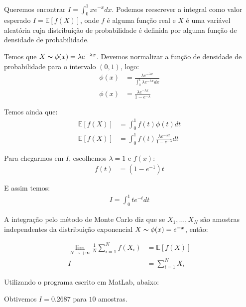 \documentclass[12pt]{article}
\newenvironment{exercise}[2][Exercício]{\begin{trivlist}
\item[\hskip \labelsep {\bfseries #1}\hskip \labelsep {\bfseries #2.}]}{\end{trivlist}}
\begin{document}
\begin{exercise}{1.c}
Queremos encontrar $I = \int_{0}^{1} xe^{-x} dx$. Podemos reescrever a integral
como valor esperado $I = \mathbb{E}[f(X)]$, onde $f$ é alguma função real e $X$
é uma variável aleatória cuja distribuição de probabilidade é definida por
alguma função de densidade de probabilidade.

Temos que $X \thicksim \phi(x) = \lambda e^{-\lambda x} $. Devemos
normalizar a função de densidade de probabilidade para o intervalo $(0,1)$,
logo:
\begin{align*}
\phi(x) &=  \frac{\lambda e^{-\lambda x}}{\int_0^1 \lambda e^{-\lambda x} dx} \\
\phi(x) &=  \frac{\lambda e^{-\lambda x}}{1-e^{-\lambda}}
\end{align*}

Temos ainda que:
\begin{align*}
\mathbb{E}[f(X)] &= \int_0^1 f(t)\phi(t) dt \\
\mathbb{E}[f(X)] &= \int_0^1 f(t)\frac{\lambda e^{-\lambda x}}{1-e^{-\lambda}} dt
\end{align*}

Para chegarmos em $I$, escolhemos $\lambda = 1$ e $f(x)$:
\begin{align*}
f(t) &= (1-e^{-1})t
\end{align*} 
  
E assim temos:
\begin{align*}
I = \int_{0}^{1} te^{-t} dt
\end{align*}

A integração pelo método de Monte Carlo diz que se $X_1, \ldots, X_N$ são
amostras independentes da distribuição exponencial $X \thicksim \phi(x) = e^{-x}
$, então:

\begin{align*}
\lim_{N\rightarrow +\infty} \frac{1}{N} \sum_{i=1}^{N} f(X_i) &=
\mathbb{E}[f(X)] \\
I &= \sum_{i=1}^{N} X_i
\end{align*}

Utilizando o programa escrito em MatLab, abaixo:


Obtivemos $I = 0.2687$ para $10$ amostras. 

\end{exercise}
\end{document}
